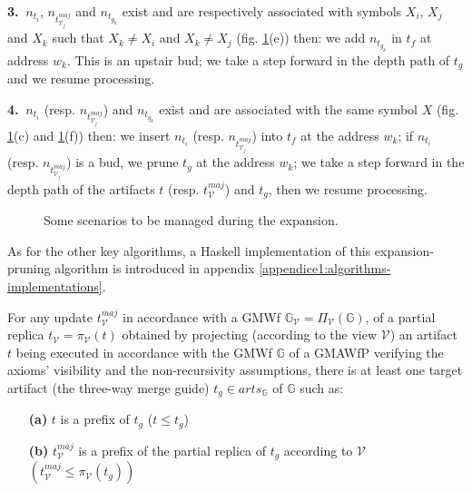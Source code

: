 {\begin{algorithm}
\begin{mdframed}[style=MyFrame]
	\noindent\textbf{3.}$~$ $n_{t_i}$, $n_{t_{\mathcal{V}_j}^{maj}}$ and $n_{t_{g_k}}$ exist and are respectively associated with symbols $X_i$, $X_j$ and $X_k$ such that $X_k \neq X_i$ and $X_k \neq X_j$ (fig. \ref{chap3:fig:expansion-pattern}(e)) then: 
	we add $n_{t_{g_k}}$ in $t_f$ at address $w_k$. This is an upstair bud; 
	we take a step forward in the depth path of $t_g$ and we resume processing.
	
	\noindent\textbf{4.}$~$ $n_{t_i}$ (resp. $n_{t_{\mathcal{V}_j}^{maj}}$) and $n_{t_{g_k}}$ exist and are associated with the same symbol $X$ (fig. \ref{chap3:fig:expansion-pattern}(c) and \ref{chap3:fig:expansion-pattern}(f)) then: 
	we insert $n_{t_i}$ (resp. $n_{t_{\mathcal{V}_j}^{maj}}$) into $t_f$ at the address $w_k$;
	if $n_{t_i}$ (resp. $n_{t_{\mathcal{V}_j}^{maj}}$) is a bud, we prune $t_g$ at the address $w_k$; 
	we take a step forward in the depth path of the artifacts $t$ (resp. $t_{\mathcal{V}}^{maj}$) and $t_g$, then we resume processing.
\end{mdframed}
\end{algorithm}

\begin{figure}[ht!]
	\noindent
	\caption{Some scenarios to be managed during the expansion.}
	\label{chap3:fig:expansion-pattern}
\end{figure}

As for the other key algorithms, a Haskell implementation of this expansion-pruning algorithm is introduced in appendix \ref{appendice1:algorithms-implementations}.

\begin{proposition}
	\label{propositionAtLeastOneGuide}
	For any update $t_{\mathcal{V}}^{maj}$ in accordance with a GMWf $\mathbb{G}_{\mathcal{V}} = \Pi_{\mathcal{V}}\left(\mathbb{G} \right)$, of a partial replica $t_{\mathcal{V}}=\pi_{\mathcal{V}}\left(t\right)$ obtained by projecting (according to the view $\mathcal{V}$) an artifact $t$ being executed in accordance with the GMWf $\mathbb{G}$ of a GMAWfP verifying the axioms' visibility and the non-recursivity assumptions, there is at least one target artifact (the three-way merge guide) $t_g \in arts_{\mathbb{G}}$ of $\mathbb{G}$ such as:
	\begin{enumerate}
		\item[\textbf{(a)}] $t$ is a prefix of $t_g$ ($t \leq t_g$)
		\item[\textbf{(b)}] $t_{\mathcal{V}}^{maj}$ is a prefix of the partial replica of $t_g$ according to $\mathcal{V}$ $\left(t_{\mathcal{V}}^{maj} \leq \pi_{\mathcal{V}}\left(t_g \right)\right)$
	\end{enumerate}	
\end{proposition}	

}
